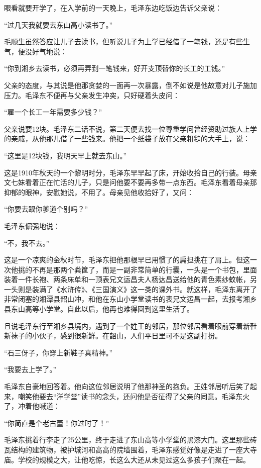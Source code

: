 \documentclass[../../dazhuan.tex]{subfiles}
\begin{document}
眼看就要开学了，在入学前的一天晚上，毛泽东边吃饭边告诉父亲说：

“过几天我就要去东山高小读书了。”

毛顺生虽然答应让儿子去读书，但听说儿子为上学已经借了一笔钱，还是有些生气，便没好气地说：

“你到湘乡去读书，必须再弄到一笔钱来，好开支顶替你的长工的工钱。”

父亲的态度，与其说是他那贪婪的一面再一次暴露，倒不如说是他故意对儿子施加压力。毛泽东不便再与父亲发生冲突，只好硬着头皮问：

“雇一个长工一年需要多少钱？”

父亲说要12块。毛泽东二话不说，第二天便去找一位尊重学问曾经资助过族人上学的亲戚，从他那儿借了一些钱来。他把一个纸袋子放在父亲粗糙的大手上，说：

“这里是12块钱，我明天早上就去东山。”

这是1910年秋天的一个黎明时分，毛泽东早早起了床，开始收拾自己的行装。母亲文七妹看着正在忙活的儿子，只是问他要不要再多带一点东西。毛泽东看着母亲那抑郁的眼神，安慰她说，不用了。母亲见他收拾好了，又问：

“你要去跟你爹道个别吗？”

毛泽东倔强地说：

“不，我不去。”

这是一个凉爽的金秋时节，毛泽东把他那根早已用惯了的扁担挑在了肩上。但这一次他挑的不再是那两个粪筐了，而是一副非常简单的行囊，一头是一个书包，里面装着一件长袍、两条床单和一顶表兄文运昌夫人杨达昌送给他的青色素纱蚊帐，另一头则是装满了《水浒传》、《三国演义》这一类的课外书。就这样，毛泽东离开了非常闭塞的湘潭县韶山冲，和他在东山小学堂读书的表兄文运昌一起，去报考湘乡县东山高等小学堂。自此以后，他再也难得回到这里生活了。

且说毛泽东行至湘乡县境内，遇到了一个姓王的邻居，那位邻居看着眼前穿着新鞋新袜子的小伙子，感到很新鲜。在韶山，人们平日里可不是这副打扮。

“石三伢子，你穿上新鞋子真精神。”

“我要去上学了。”

毛泽东自豪地回答着。他向这位邻居说明了他那神圣的抱负。王姓邻居听后笑了起来，嘲笑他要去“洋学堂”读书的念头，还问他是否征得了父亲的同意。毛泽东火了，冲着他喊道：

“你简直是个老古董！你过时了！”

毛泽东挑着行李走了25公里，终于走进了东山高等小学堂的黑漆大门。这里那些砖瓦结构的建筑物，被护城河和高高的院墙围着，毛泽东感觉好像是走进了一座大寺庙。学校的规模之大，让他吃惊，长这么大还从未见过这么多孩子们聚在一起。
\end{document}
